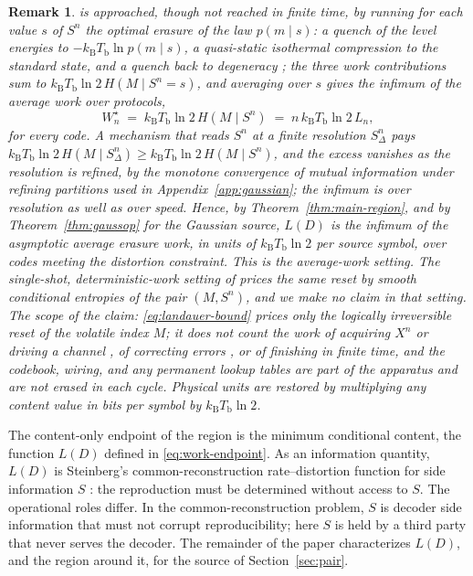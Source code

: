 \documentclass[11pt,onecolumn]{IEEEtran}
\newtheorem{remark}[theorem]{Remark}
\newcommand{\kb}{k_{\mathrm{B}}}
\begin{document}
\begin{remark}
is approached, though not reached in finite time, by running for each
value $s$ of $S^n$ the optimal erasure of the law $p(m\mid s)$: a quench
of the level energies to $-\kb T_{\mathrm b}\ln p(m\mid s)$, a
quasi-static isothermal compression to the standard state, and a quench
back to degeneracy \cite{esposito2011}; the three work contributions sum
to $\kb T_{\mathrm b}\ln2\,H(M\mid S^n=s)$, and averaging over $s$ gives
the infimum of the average work over protocols,
\begin{equation}
 W_n^{\star}\;=\;\kb T_{\mathrm b}\ln2\,H(M\mid S^n)\;=\;n\,\kb T_{\mathrm b}\ln2\,L_n ,
 \label{eq:landauer-bound}
\end{equation}
for every code. A mechanism that reads $S^n$ at a finite resolution
$S_\Delta^n$ pays $\kb T_{\mathrm b}\ln2\,H(M\mid S_\Delta^n)\ge\kb
T_{\mathrm b}\ln2\,H(M\mid S^n)$, and the excess vanishes as the
resolution is refined, by the monotone convergence of mutual information
under refining partitions used in Appendix~\ref{app:gaussian}; the
infimum is over resolution as well as over speed. Hence, by
Theorem~\ref{thm:main-region}, and by Theorem~\ref{thm:gaussop} for the
Gaussian source, $L(D)$ is the infimum of the asymptotic average erasure
work, in units of $\kb T_{\mathrm b}\ln2$ per source symbol, over codes
meeting the distortion constraint. This is the average-work setting. The
single-shot, deterministic-work setting of \cite{delrio2011,faist2015}
prices the same reset by smooth conditional entropies of the pair
$(M,S^n)$, and we make no claim in that setting. The scope of the claim:
\eqref{eq:landauer-bound} prices only the logically irreversible reset
of the volatile index $M$; it does not count the work of acquiring $X^n$
or driving a channel \cite{bennett1973}, of correcting errors
\cite{landauer1961}, or of finishing in finite time, and the codebook,
wiring, and any permanent lookup tables are part of the apparatus and are
not erased in each cycle. Physical units are restored by multiplying any
content value in bits per symbol by $\kb T_{\mathrm b}\ln2$.
\end{remark}



The content-only endpoint of the region is the minimum conditional content, the
function $L(D)$ defined in \eqref{eq:work-endpoint}.
As an information quantity, $L(D)$ is Steinberg's common-reconstruction
rate--distortion function for side information $S$ \cite{steinberg2009}: the
reproduction must be determined without access to $S$. The operational roles
differ. In the common-reconstruction problem, $S$ is decoder side information
that must not corrupt reproducibility; here $S$ is held by a third party
that never serves the decoder. The remainder of the paper characterizes
$L(D)$, and the region around it, for the source of Section~\ref{sec:pair}.
\end{document}
